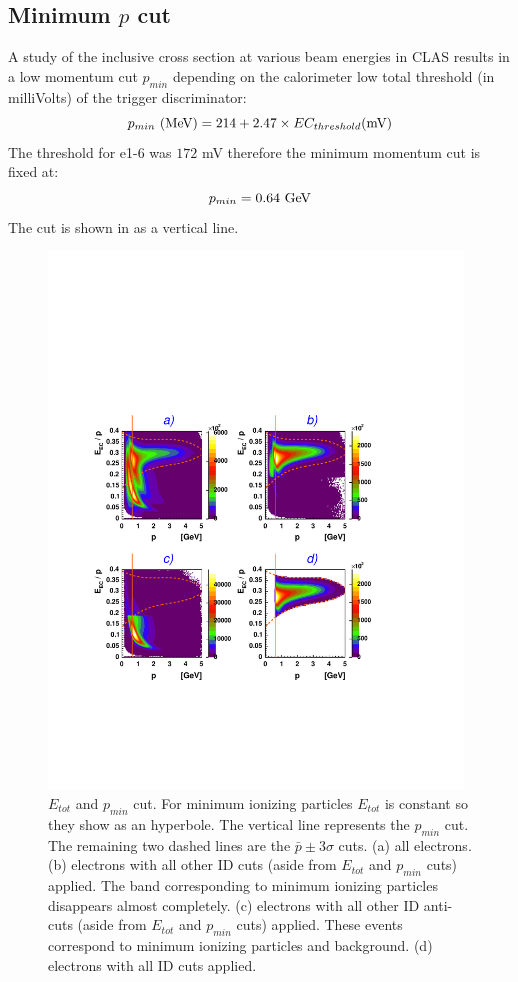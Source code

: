 \subsection{ Minimum $p$ cut}
A study \cite{bib:ecmin} of the inclusive cross section at various beam energies in CLAS 
results in a low momentum cut $p_{min}$ depending on the calorimeter low total threshold
(in milliVolts)
of the trigger discriminator:
$$
 p_{min}\,\,{\rm (MeV)} = 214 + 2.47\times EC_{threshold}{\rm (mV)}
$$
The threshold for e1-6 was $172$ mV therefore the minimum momentum cut is fixed at:
$$
p_{min} = 0.64\,\,{\rm GeV}
$$
The cut is shown in  as a vertical line.
\begin{figure}[t]
\begin{center}
  \includegraphics[width=11cm, bb=40 140 490 540]{data_reduction/img/ec1_pid}
  \caption[$E_{tot}$ and $p_{min}$ cut]
  { $E_{tot}$ and $p_{min}$ cut.
  	     For minimum ionizing particles $E_{tot}$ is constant so 
	     they show as an hyperbole.
             The vertical line represents the $p_{min}$ cut.
             The remaining two dashed lines are the $\bar{p} \pm 3\sigma$ cuts.
             (a) all electrons.
	     (b) electrons with all other ID cuts (aside from $E_{tot}$ and $p_{min}$ cuts) applied. 
             The band corresponding to minimum ionizing particles disappears almost completely.
             (c) electrons with all other ID 
	     anti-cuts (aside from $E_{tot}$ and $p_{min}$ cuts) applied. 
	     These events correspond to minimum ionizing particles and background.
             (d) electrons with all ID cuts applied.}
 \label{fig:ec1cut}
 \end{center}
\end{figure}
\cia\vspace{-2cm}
